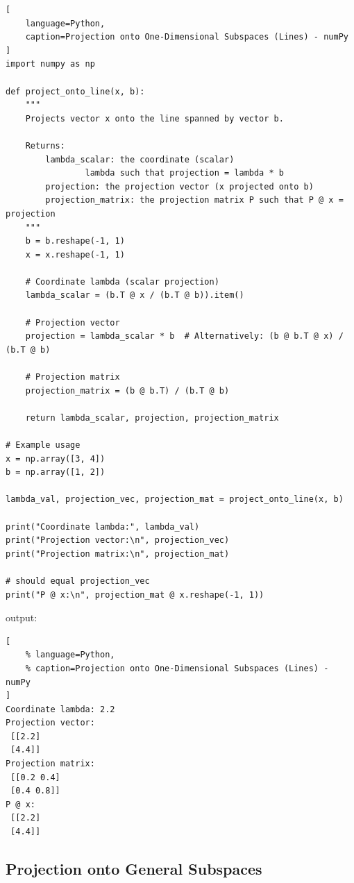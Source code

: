 \begin{lstlisting}[
    language=Python,
    caption=Projection onto One-Dimensional Subspaces (Lines) - numPy
]
import numpy as np

def project_onto_line(x, b):
    """
    Projects vector x onto the line spanned by vector b.

    Returns:
        lambda_scalar: the coordinate (scalar) 
                lambda such that projection = lambda * b
        projection: the projection vector (x projected onto b)
        projection_matrix: the projection matrix P such that P @ x = projection
    """
    b = b.reshape(-1, 1)
    x = x.reshape(-1, 1)

    # Coordinate lambda (scalar projection)
    lambda_scalar = (b.T @ x / (b.T @ b)).item()

    # Projection vector
    projection = lambda_scalar * b  # Alternatively: (b @ b.T @ x) / (b.T @ b)

    # Projection matrix
    projection_matrix = (b @ b.T) / (b.T @ b)

    return lambda_scalar, projection, projection_matrix

# Example usage
x = np.array([3, 4])
b = np.array([1, 2])

lambda_val, projection_vec, projection_mat = project_onto_line(x, b)

print("Coordinate lambda:", lambda_val)
print("Projection vector:\n", projection_vec)
print("Projection matrix:\n", projection_mat)

# should equal projection_vec
print("P @ x:\n", projection_mat @ x.reshape(-1, 1))  
\end{lstlisting}

output:

\begin{lstlisting}[
    % language=Python,
    % caption=Projection onto One-Dimensional Subspaces (Lines) - numPy
]
Coordinate lambda: 2.2
Projection vector:
 [[2.2]
 [4.4]]
Projection matrix:
 [[0.2 0.4]
 [0.4 0.8]]
P @ x:
 [[2.2]
 [4.4]]
\end{lstlisting}









\subsection{Projection onto General Subspaces}

